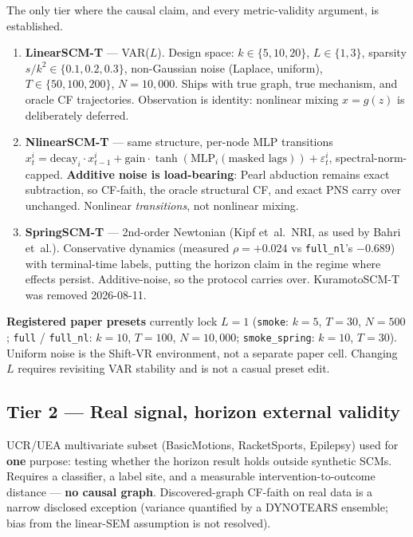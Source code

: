 \documentclass[11pt]{article}
\begin{document}
The only tier where the causal claim, and every metric-validity argument,
is established.

\begin{enumerate}[leftmargin=*]
  \item \textbf{LinearSCM-T} --- VAR($L$). Design space:
        $k \in \{5, 10, 20\}$,
        $L \in \{1, 3\}$,
        sparsity $s/k^{2} \in \{0.1, 0.2, 0.3\}$,
        non-Gaussian noise (Laplace, uniform),
        $T \in \{50, 100, 200\}$, $N = 10{,}000$.
        Ships with true graph, true mechanism, and oracle CF trajectories.
        Observation is identity: nonlinear mixing $x = g(z)$ is
        deliberately deferred.

  \item \textbf{NlinearSCM-T} --- same structure, per-node MLP
        transitions
        $x_t^i = \mathrm{decay}_i \cdot x_{t-1}^i
        + \mathrm{gain}\cdot\tanh(\mathrm{MLP}_i(\text{masked lags}))
        + \varepsilon_t^i$,
        spectral-norm-capped. \textbf{Additive noise is load-bearing}:
        Pearl abduction remains exact subtraction, so CF-faith, the
        oracle structural CF, and exact PNS carry over unchanged.
        Nonlinear \emph{transitions}, not nonlinear mixing.

  \item \textbf{SpringSCM-T} --- 2nd-order Newtonian (Kipf et~al.\ NRI,
        as used by Bahri et~al.). Conservative dynamics (measured
        $\rho = +0.024$ vs \texttt{full\_nl}'s $-0.689$) with
        terminal-time labels, putting the horizon claim in the regime
        where effects persist. Additive-noise, so the protocol carries
        over. KuramotoSCM-T was removed 2026-08-11.
\end{enumerate}

\noindent\textbf{Registered paper presets} currently lock $L = 1$
(\texttt{smoke}: $k{=}5$, $T{=}30$, $N{=}500$;
\texttt{full} / \texttt{full\_nl}: $k{=}10$, $T{=}100$, $N{=}10{,}000$;
\texttt{smoke\_spring}: $k{=}10$, $T{=}30$). Uniform noise is the
Shift-VR environment, not a separate paper cell. Changing $L$ requires
revisiting VAR stability and is not a casual preset edit.

\subsection{Tier 2 --- Real signal, horizon external validity}

UCR/UEA multivariate subset (BasicMotions, RacketSports, Epilepsy) used
for \textbf{one} purpose: testing whether the horizon result holds
outside synthetic SCMs. Requires a classifier, a label site, and a
measurable intervention-to-outcome distance --- \textbf{no causal
graph}. Discovered-graph CF-faith on real data is a narrow disclosed
exception (variance quantified by a DYNOTEARS ensemble; bias from the
linear-SEM assumption is not resolved).
\end{document}
